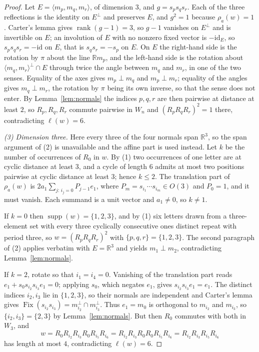 \documentclass[11pt,a4paper]{article}
\newcommand{\R}{\mathbb{R}}
\theoremstyle{definition}
\theoremstyle{remark}
\theoremstyle{plain}
\begin{document}
\begin{proof}
Let $E=\langle m_p,m_q,m_r\rangle$, of dimension $3$, and $g=s_ps_qs_r$. Each of the three
reflections is the identity on $E^{\perp}$ and preserves $E$, and $g^2=1$ because $\rho_a(w)=1$.
Carter's lemma gives $\operatorname{rank}(g-1)=3$, so $g-1$ vanishes on $E^{\perp}$ and is
invertible on $E$; an involution of $E$ with no nonzero fixed vector is $-\mathrm{id}_E$, so
$s_ps_qs_r=-\mathrm{id}$ on $E$, that is $s_qs_r=-s_p$ on $E$. On $E$ the right-hand side is the
rotation by $\pi$ about the line $\R m_p$, and the left-hand side is the rotation about
$\langle m_q,m_r\rangle^{\perp}\cap E$ through twice the angle between $m_q$ and $m_r$, in one
of the two senses. Equality of the axes gives $m_p\perp m_q$ and $m_p\perp m_r$; equality of
the angles gives $m_q\perp m_r$, the rotation by $\pi$ being its own inverse, so that the sense
does not enter. By Lemma~\ref{lem:normals} the indices $p,q,r$ are then pairwise at distance at
least $2$, so $R_p,R_q,R_r$ commute pairwise in $W_n$ and $(R_pR_qR_r)^2=1$ there, contradicting
$\ell(w)=6$.

\emph{(3) Dimension three.} Here every three of the four normals span $\R^3$, so the span
argument of (2) is unavailable and the affine part is used instead. Let $k$ be the number of
occurrences of $R_0$ in $w$. By (1) two occurrences of one letter are at cyclic distance at
least $3$, and a cycle of length $6$ admits at most two positions pairwise at cyclic distance
at least $3$; hence $k\le2$. The translation part of $\rho_a(w)$ is
$2a_1\sum_{j:\,i_j=0}P_{j-1}e_1$, where $P_m=s_{i_1}\cdots s_{i_m}\in O(3)$ and $P_0=1$, and it
must vanish. Each summand is a unit vector and $a_1\ne0$, so $k\ne1$.

If $k=0$ then $\operatorname{supp}(w)=\{1,2,3\}$, and by (1) six letters drawn from a
three-element set with every three cyclically consecutive ones distinct repeat with period
three, so $w=(R_pR_qR_r)^2$ with $\{p,q,r\}=\{1,2,3\}$. The second paragraph of (2) applies
verbatim with $E=\R^3$ and yields $m_1\perp m_2$, contradicting Lemma~\ref{lem:normals}.

If $k=2$, rotate so that $i_1=i_4=0$. Vanishing of the translation part reads
$e_1+s_0s_{i_2}s_{i_3}e_1=0$; applying $s_0$, which negates $e_1$, gives
$s_{i_2}s_{i_3}e_1=e_1$. The distinct indices $i_2,i_3$ lie in $\{1,2,3\}$, so their normals are
independent and Carter's lemma gives
$\operatorname{Fix}(s_{i_2}s_{i_3})=m_{i_2}^{\perp}\cap m_{i_3}^{\perp}$. Thus $e_1=m_0$ is
orthogonal to $m_{i_2}$ and $m_{i_3}$, so $\{i_2,i_3\}=\{2,3\}$ by Lemma~\ref{lem:normals}. But
then $R_0$ commutes with both in $W_3$, and
\[
w=R_0R_{i_2}R_{i_3}R_0R_{i_5}R_{i_6}=R_{i_2}R_{i_3}R_0R_0R_{i_5}R_{i_6}
 =R_{i_2}R_{i_3}R_{i_5}R_{i_6}
\]
has length at most $4$, contradicting $\ell(w)=6$.


\end{proof}
\end{document}
